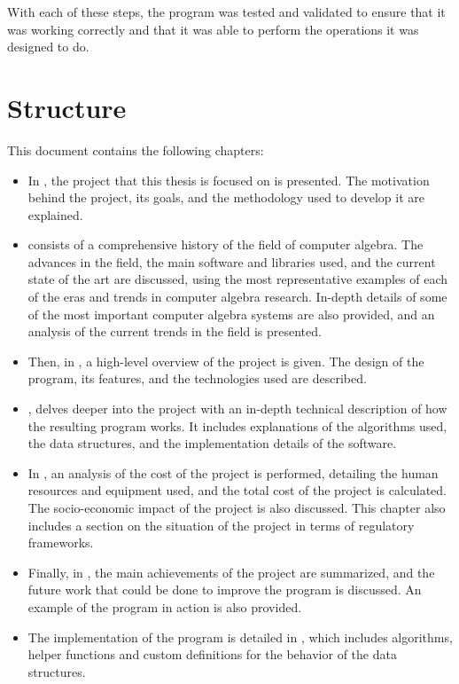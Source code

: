With each of these steps, the program was tested and validated to ensure that it was working correctly and that it was able to perform the operations it was designed to do.

\section{Structure}\label{sec:structure}
This document contains the following chapters:
\begin{itemize}
  \item In , the project that this thesis is focused on is presented. The motivation behind the project, its goals, and the methodology used to develop it are explained.
  \item {} consists of a comprehensive history of the field of computer algebra. The advances in the field, the main software and libraries used, and the current state of the art are discussed, using the most representative examples of each of the eras and trends in computer algebra research. In-depth details of some of the most important computer algebra systems are also provided, and an analysis of the current trends in the field is presented.
  \item Then, in , a high-level overview of the project is given. The design of the program, its features, and the technologies used are described.
  \item {}, delves deeper into the project with an in-depth technical description of how the resulting program works. It includes explanations of the algorithms used, the data structures, and the implementation details of the software.
  \item In , an analysis of the cost of the project is performed, detailing the human resources and equipment used, and the total cost of the project is calculated. The socio-economic impact of the project is also discussed. This chapter also includes a section on the situation of the project in terms of regulatory frameworks.
  \item Finally, in , the main achievements of the project are summarized, and the future work that could be done to improve the program is discussed. An example of the program in action is also provided.
  \item The implementation of the program is detailed in , which includes algorithms, helper functions and custom definitions for the behavior of the data structures.
\end{itemize}
